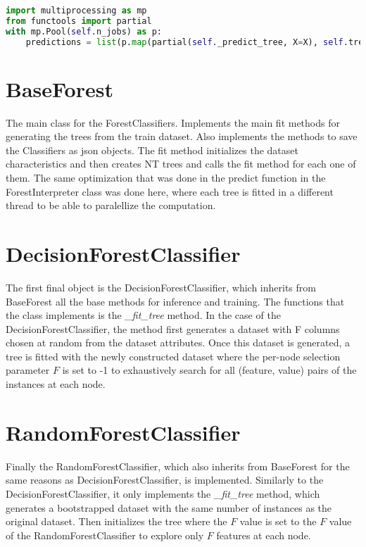\begin{lstlisting}[language=Python]
import multiprocessing as mp
from functools import partial
with mp.Pool(self.n_jobs) as p:
    predictions = list(p.map(partial(self._predict_tree, X=X), self.trees))
\end{lstlisting}


\section{BaseForest}

The main class for the ForestClassifiers. Implements the main fit methods for generating the trees from the train dataset. Also implements the methods to save the Classifiers as json objects. 
The fit method initializes the dataset characteristics and then creates NT trees and calls the fit method for each one of them. The same optimization that was done in the predict function in the ForestInterpreter class was done here, where each tree is fitted in a different thread to be able to paralellize the computation.

\section{DecisionForestClassifier}

The first final object is the DecisionForestClassifier, which inherits from BaseForest all the base methods for inference and training. The functions that the class implements is the \textit{\_fit\_tree} method. In the case of the DecisionForestClassifier, the method first generates a dataset with F columns chosen at random from the dataset attributes. Once this dataset is generated, a tree is fitted with the newly constructed dataset where the per-node selection parameter $F$ is set to -1 to exhaustively search for all (feature, value) pairs of the instances at each node.

\section{RandomForestClassifier}

Finally the RandomForestClassifier, which also inherits from BaseForest for the same reasons as DecisionForestClassifier, is implemented. Similarly to the DecisionForestClassifier, it only implements the \textit{\_fit\_tree} method, which generates a bootstrapped dataset with the same number of instances as the original dataset. Then initializes the tree where the $F$ value is set to the $F$ value of the RandomForestClassifier to explore only $F$ features at each node.
